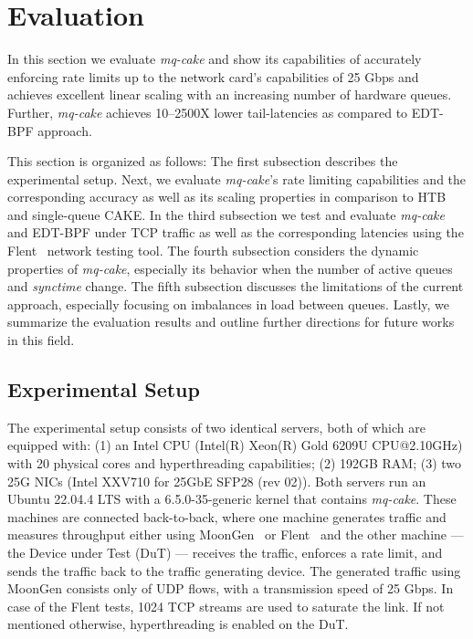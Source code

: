 \section{Evaluation}\label{sec:evaluation}
In this section we evaluate \textit{mq-cake} and show its capabilities of accurately enforcing rate limits up to the network card's capabilities of 25 Gbps and achieves excellent linear scaling with an increasing number of hardware queues.
%
Further, \textit{mq-cake} achieves 10--2500X lower tail-latencies as compared to EDT-BPF approach.

This section is organized as follows:
%
The first subsection describes the experimental setup. 
%
Next, we evaluate \textit{mq-cake}'s rate limiting capabilities and the corresponding accuracy as well as its scaling properties in comparison to HTB and single-queue CAKE.
%
In the third subsection we test and evaluate \textit{mq-cake} and EDT-BPF under TCP traffic as well as the corresponding latencies using the Flent~\cite{flent} network testing tool.
%
The fourth subsection considers the dynamic properties of \textit{mq-cake}, especially its behavior when the number of active queues and \textit{synctime} change.
%
The fifth subsection discusses the limitations of the current approach, especially focusing on imbalances in load between queues.
%
Lastly, we summarize the evaluation results and outline further directions for future works in this field.

\subsection{Experimental Setup}
The experimental setup consists of two identical servers, both of which are equipped with: 
(1) an Intel CPU (Intel(R) Xeon(R) Gold 6209U CPU@2.10GHz) with 20 physical cores and hyperthreading capabilities;
(2) 192GB RAM;
(3) two 25G NICs (Intel XXV710 for 25GbE SFP28 (rev 02)).
Both servers run an Ubuntu 22.04.4 LTS with a 6.5.0-35-generic kernel that contains \textit{mq-cake}. 
These machines are connected back-to-back, where one machine generates traffic and measures throughput either using MoonGen~\cite{moongen} or Flent~\cite{flent} and the other machine --- the Device under Test (DuT) --- receives the traffic, enforces a rate limit, and sends the traffic back to the traffic generating device.
%
The generated traffic using MoonGen consists only of UDP flows, with a transmission speed of 25 Gbps.
%
In case of the Flent tests, 1024 TCP streams are used to saturate the link.
%
If not mentioned otherwise, hyperthreading is enabled on the DuT.

